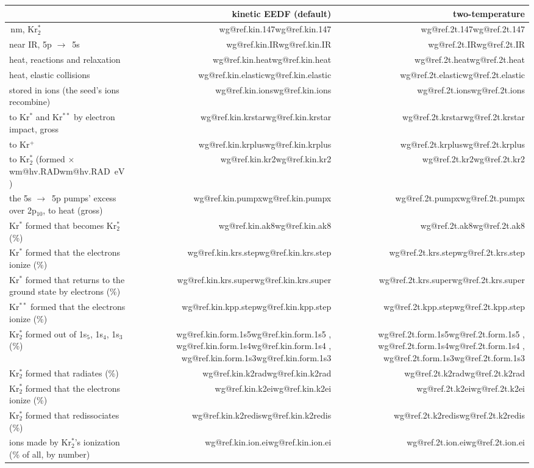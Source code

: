 \documentclass[11pt]{article}
\makeatletter
\newcommand\wm[1]{\ifcsname wm@#1\endcsname\csname wm@#1\endcsname
  \else\errmessage{no map number '#1'. Rerun make_system_map_v0_5.py}\fi}
\newcommand\wg[1]{\ifcsname wg@#1\endcsname\csname wg@#1\endcsname
  \else\errmessage{no overview number '#1'. Rerun make_overview_v0_5.py}\fi}
\newcommand{\unit}[1]{\ensuremath{\,\mathrm{#1}}}
\newcommand{\Krs}{Kr\ensuremath{^*}}
\newcommand{\Krpp}{Kr\ensuremath{^{**}}}
\newcommand{\Krp}{Kr\ensuremath{^+}}
\newcommand{\Krts}{Kr\ensuremath{_2^*}}
\newcommand{\lv}[1]{1s\ensuremath{_#1}}
\newcommand{\ra}{\ensuremath{\to}\ }
\newcommand{\x}[1]{\ensuremath{\times}#1}
\makeatother
\begin{document}
\begin{table}[H]
\centering\footnotesize
\begin{tabular}{@{}>{\raggedright\arraybackslash}p{8.6cm}rr@{}}
\toprule
 & kinetic EEDF (default) & two-temperature\\
\midrule
147\unit{nm}, \Krts{} & \wg{ref.kin.147} & \wg{ref.2t.147}\\
near IR, 5p \ra 5s & \wg{ref.kin.IR} & \wg{ref.2t.IR}\\
heat, reactions and relaxation & \wg{ref.kin.heat} & \wg{ref.2t.heat}\\
heat, elastic collisions & \wg{ref.kin.elastic} & \wg{ref.2t.elastic}\\
stored in ions (the seed's ions recombine) & \wg{ref.kin.ions} & \wg{ref.2t.ions}\\
to \Krs{} and \Krpp{} by electron impact, gross & \wg{ref.kin.krstar} & \wg{ref.2t.krstar}\\
to \Krp{} & \wg{ref.kin.krplus} & \wg{ref.2t.krplus}\\
to \Krts{} (formed \x{} \wm{hv.RAD}\unit{eV}) & \wg{ref.kin.kr2} & \wg{ref.2t.kr2}\\
the 5s \ra 5p pumps' excess over 2p$_{10}$, to heat (gross) & \wg{ref.kin.pumpx} & \wg{ref.2t.pumpx}\\
\Krs{} formed that becomes \Krts{} (\%) & \wg{ref.kin.ak8} & \wg{ref.2t.ak8}\\
\Krs{} formed that the electrons ionize (\%) & \wg{ref.kin.krs.step} & \wg{ref.2t.krs.step}\\
\Krs{} formed that returns to the ground state by electrons (\%) & \wg{ref.kin.krs.super} & \wg{ref.2t.krs.super}\\
\Krpp{} formed that the electrons ionize (\%) & \wg{ref.kin.kpp.step} & \wg{ref.2t.kpp.step}\\
\Krts{} formed out of \lv{5}, \lv{4}, \lv{3} (\%) & \wg{ref.kin.form.1s5}, \wg{ref.kin.form.1s4}, \wg{ref.kin.form.1s3} & \wg{ref.2t.form.1s5}, \wg{ref.2t.form.1s4}, \wg{ref.2t.form.1s3}\\
\Krts{} formed that radiates (\%) & \wg{ref.kin.k2rad} & \wg{ref.2t.k2rad}\\
\Krts{} formed that the electrons ionize (\%) & \wg{ref.kin.k2ei} & \wg{ref.2t.k2ei}\\
\Krts{} formed that redissociates (\%) & \wg{ref.kin.k2redis} & \wg{ref.2t.k2redis}\\
ions made by \Krts's ionization (\% of all, by number) & \wg{ref.kin.ion.ei} & \wg{ref.2t.ion.ei}\\

\end{tabular}
\end{table}
\end{document}
